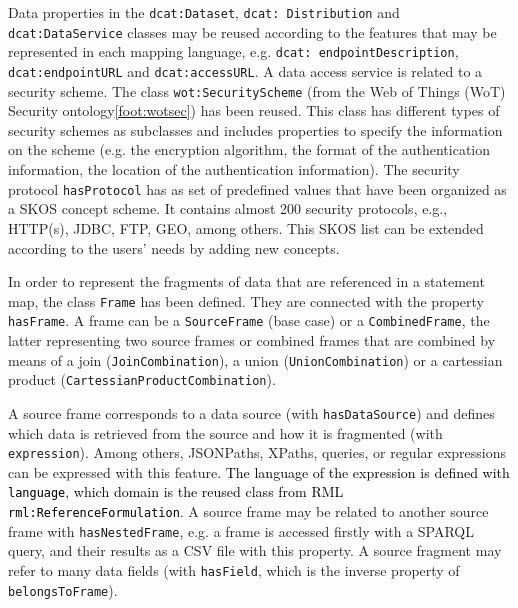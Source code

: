 Data properties in the \texttt{dcat:Dataset}, \texttt{dcat: Distribution} and \texttt{dcat:DataService} classes may be reused according to the features that may be represented in each mapping language, e.g. \texttt{dcat: endpointDescription}, \texttt{dcat:endpointURL} and \texttt{dcat:accessURL}. A data access service is related to a security scheme. The class \texttt{wot:Securi\-tyScheme} (from the Web of Things (WoT) Security ontology\cref{foot:wotsec}) has been reused. This class has different types of security schemes as subclasses and includes properties to specify the information on the scheme (e.g. the encryption algorithm, the format of the authentication information, the location of the authentication information). The security protocol \texttt{hasProtocol} has as set of predefined values that have been organized as a SKOS concept scheme. It contains almost 200 security protocols, e.g., HTTP(s), JDBC, FTP, GEO, among others. This SKOS list can be extended according to the users' needs by adding new concepts. 

In order to represent the fragments of data that are referenced in a statement map, the class \texttt{Frame} has been defined. They are connected with the property \texttt{hasFrame}. A frame can be a \texttt{SourceFrame} (base case) or a \texttt{CombinedFrame}, the latter representing two source frames or combined frames that are combined by means of a join (\texttt{JoinCombination}), a union (\texttt{UnionCombination}) or a cartessian product (\texttt{CartessianProductCombination}). 

A source frame corresponds to a data source (with \texttt{hasDataSource}) and defines which data is retrieved from the source and how it is fragmented (with \texttt{expression}). Among others, JSONPaths, XPaths, queries, or regular expressions can be expressed with this feature. \textcolor{black}{The language of the expression is defined with \texttt{language}, which domain is the reused class from RML \texttt{rml:ReferenceFormulation}}. A source frame may be related to another source frame with  \texttt{hasNest\-edFrame}, e.g. a frame is accessed firstly with a SPARQL query, and their results as a CSV file with this property. A source fragment may refer to many data fields (with \texttt{hasField}, which is the inverse property of \texttt{belongsToFrame}).



